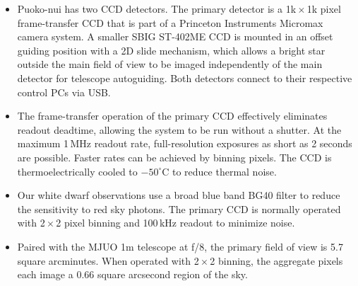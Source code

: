 \vspace{-1.75cm}
\begin{itemize}[itemsep=20pt]
	
\item[] Puoko-nui has two CCD detectors. The primary detector is a
1k\,$\times$\,1k pixel frame-transfer CCD that is part of a Princeton Instruments
Micromax camera system.  A smaller SBIG ST-402ME CCD is mounted in an
offset guiding position with a 2D slide mechanism, which allows a bright star
outside the main field of view to be imaged independently of the main detector
for telescope autoguiding. Both detectors connect to their respective control PCs
via USB.

\item[] The frame-transfer operation of the primary CCD effectively eliminates
readout deadtime, allowing the system to be run without a shutter. At the
maximum 1\,MHz readout rate, full-resolution exposures as short as 2 seconds
are possible. Faster rates can be achieved by binning pixels. The CCD is
thermoelectrically cooled to $-50^\circ$C to reduce thermal noise.

\item[] Our white dwarf observations use a broad blue band
BG40 filter to reduce the sensitivity to red sky photons.
The primary CCD is normally operated with 2\,$\times$\,2 pixel binning and 100\,kHz 
readout to minimize noise. 

\item[] Paired with the MJUO 1m telescope at f/8, the primary field of view is
5.7 square arcminutes. When operated with 2\,$\times$\,2 binning, the aggregate
pixels each image a 0.66 square arcsecond region of the sky.

\end{itemize}
\vspace{-1.75cm}